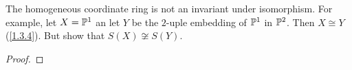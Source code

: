 \label{1.3.9}

The homogeneous coordinate ring is not an invariant under isomorphism. For example, let $X = \P^1$ an let $Y$ be the $2$-uple embedding of $\P^1$ in $\P^2$. Then $X \cong Y$ (\ref{1.3.4}). But show that $S(X) \not \cong S(Y)$.

\begin{proof}

\end{proof}
